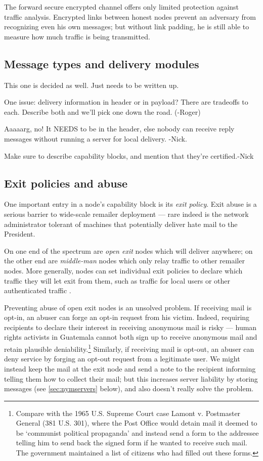 \documentclass{llncs}
\begin{document}
The forward secure encrypted channel offers only limited protection
against traffic analysis. Encrypted links between honest nodes prevent
an adversary from recognizing even his own messages; but without
link padding, he is still able to measure how much traffic is being
transmitted.

\subsection{Message types and delivery modules}

This one is decided as well. Just needs to be written up.

One issue: delivery information in header or in payload?
There are tradeoffs to each. Describe both and we'll pick one down the
road. (-Roger)

Aaaaarg, no!  It NEEDS to be in the header, else nobody can receive
reply messages without running a server for local delivery. -Nick.

Make sure to describe capability blocks, and mention that they're
certified.-Nick

\subsection{Exit policies and abuse}

One important entry in a node's capability block is its \emph{exit
policy}. Exit abuse is a serious barrier to wide-scale remailer deployment
--- rare indeed is the network administrator tolerant of machines that
potentially deliver hate mail to the President.

On one end of the spectrum are \emph{open exit} nodes which will
deliver anywhere; on the other end are \emph{middle-man} nodes which
only relay traffic to other remailer nodes. More generally, nodes can
set individual exit policies to declare which traffic they will let
exit from them, such as traffic for local users or other authenticated
traffic \cite{onion-discex00}.

Preventing abuse of open exit nodes is an unsolved problem. If
receiving mail is opt-in, an abuser can forge an opt-in request from
his victim. Indeed, requiring recipients to declare their interest
in receiving anonymous mail is risky --- human rights activists in
Guatemala cannot both sign up to receive anonymous mail and retain
plausible deniability.\footnote{
  Compare with the 1965 U.S. Supreme Court case Lamont v. Postmaster
  General (381 U.S. 301), where the Post Office would detain mail it
  deemed to be `communist political propaganda' and instead send a form
  to the addressee telling him to send back the signed form if he wanted
  to receive such mail. The government maintained a list of citizens
  who had filled out these forms.
} Similarly, if receiving mail is opt-out, an abuser can deny service
by forging an opt-out request from a legitimate user. We might instead
keep the mail at the exit node and send a note to the recipient
informing telling them how to collect their mail; but this increases
server liability by storing messages (see \ref{sec:nymservers} below),
and also doesn't really solve the problem.
\end{document}
